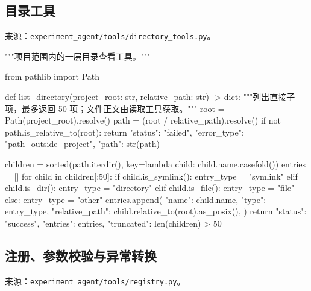 \subsection{目录工具}

来源：\nolinkurl{experiment_agent/tools/directory_tools.py}。

\begin{Code}
"""项目范围内的一层目录查看工具。"""

from pathlib import Path


def list_directory(project_root: str, relative_path: str) -> dict:
    """列出直接子项，最多返回 50 项；文件正文由读取工具获取。"""
    root = Path(project_root).resolve()
    path = (root / relative_path).resolve()
    if not path.is_relative_to(root):
        return {"status": "failed", "error_type": "path_outside_project", "path": str(path)}

    children = sorted(path.iterdir(), key=lambda child: child.name.casefold())
    entries = []
    for child in children[:50]:
        if child.is_symlink():
            entry_type = "symlink"
        elif child.is_dir():
            entry_type = "directory"
        elif child.is_file():
            entry_type = "file"
        else:
            entry_type = "other"
        entries.append({
            "name": child.name,
            "type": entry_type,
            "relative_path": child.relative_to(root).as_posix(),
        })
    return {"status": "success", "entries": entries, "truncated": len(children) > 50}
\end{Code}

\subsection{注册、参数校验与异常转换}

来源：\nolinkurl{experiment_agent/tools/registry.py}。

